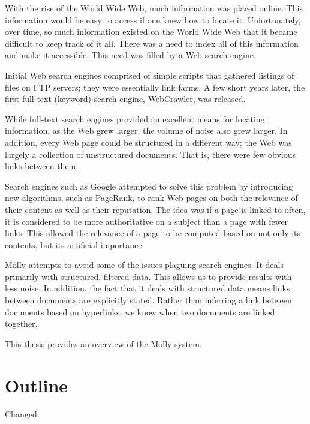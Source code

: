 \documentclass[12pt,letterpaper,oneside,notitlepage]{report}
\theoremstyle{definition}
\begin{document}
      With the rise of the World Wide Web, much information was placed online.  This information would be easy to access if one knew how to locate it.  Unfortunately, over time, so much information existed on the World Wide Web that it became difficult to keep track of it all.  There was a need to index all of this information and make it accessible.  This need was filled by a Web search engine.
    
      Initial Web search engines comprised of simple scripts that gathered listings of files on FTP servers; they were essentially link farms.  A few short years later, the first full-text (keyword) search engine, WebCrawler, was released.
    
      While full-text search engines provided an excellent means for locating information, as the Web grew larger, the volume of noise also grew larger.  In addition, every Web page could be structured in a different way; the Web was largely a collection of unstructured documents.  That is, there were few obvious links between them.
    
      Search engines such as Google attempted to solve this problem by introducing new algorithms, such as PageRank, to rank Web pages on both the relevance of their content as well as their reputation.  The idea was if a page is linked to often, it is considered to be more authoritative on a subject than a page with fewer links.  This allowed the relevance of a page to be computed based on not only its contents, but its artificial importance.
    
      Molly attempts to avoid some of the issues plaguing search engines.  It deals primarily with structured, filtered data.  This allows us to provide results with less noise.  In addition, the fact that it deals with structured data means links between documents are explicitly stated.  Rather than inferring a link between documents based on hyperlinks, we know when two documents are linked together.
    
      This thesis provides an overview of the Molly system.
    
    \section*{Outline}
      Changed.

  \tableofcontents

  \listoftables
  \listoffigures
  \listofalgorithms

  \clearpage
  
\end{document}
